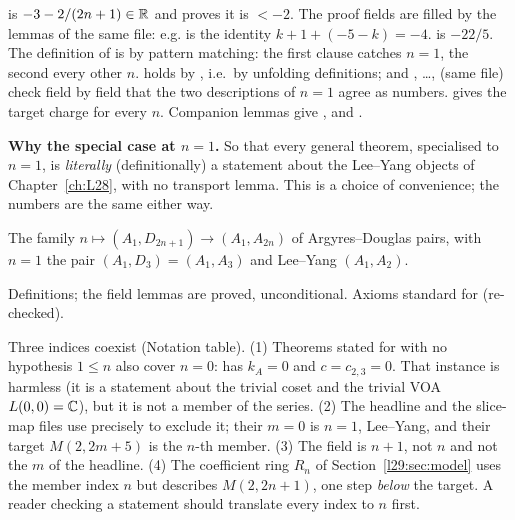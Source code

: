 \begin{dictionary}
 is $-3-2/(2n+1)\in\mathbb{R}$ and  proves it is $<-2$. The proof fields are filled by
the lemmas of the same file: e.g.  is the identity $k+1+(-5-k)=-4$.  is
$-22/5$. The definition of  is by pattern matching: the first clause  catches
$n=1$, the second every other $n$.  holds by , i.e.\ by unfolding definitions; and
, \dots,  (same file) check field by field that the two descriptions
of $n=1$ agree as numbers.  gives the target charge for every $n$. Companion lemmas give
,  and .

\textbf{Why the special case at $n=1$.} So that every general theorem, specialised to $n=1$, is \emph{literally}
(definitionally) a statement about the Lee--Yang objects of Chapter~\ref{ch:L28}, with no transport lemma. This is a
choice of convenience; the numbers are the same either way.
\end{dictionary}

\begin{physics}
The family $n\mapsto(A_1,D_{2n+1})\to(A_1,A_{2n})$ of Argyres--Douglas pairs, with $n=1$ the pair $(A_1,D_3)=(A_1,A_3)$
and Lee--Yang $(A_1,A_2)$.
\end{physics}

\begin{status}
Definitions; the field lemmas are proved, unconditional. Axioms standard for  (re-checked).
\end{status}

\begin{warning}[title={Index conventions, and the member $n=0$}]\label{l29:warn:index}
Three indices coexist (Notation table). (1) Theorems stated for  with no hypothesis $1\le n$ also cover
$n=0$:  has $k_A=0$ and $c=c_{2,3}=0$. That instance is harmless (it is a statement about
the trivial coset and the trivial VOA $L(0,0)={\mathbb{C}}$), but it is not a member of the series. (2) The headline and the
slice-map files use  precisely to exclude it; their $m=0$ is $n=1$, Lee--Yang, and their
target $M(2,2m+5)$ is the $n$-th member. (3) The field  is $n+1$, not $n$ and not the $m$ of the
headline. (4) The coefficient ring $R_n$ of Section~\ref{l29:sec:model} uses the member index $n$ but describes
$M(2,2n+1)$, one step \emph{below} the target. A reader checking a statement should translate every index to $n$
first.
\end{warning}

